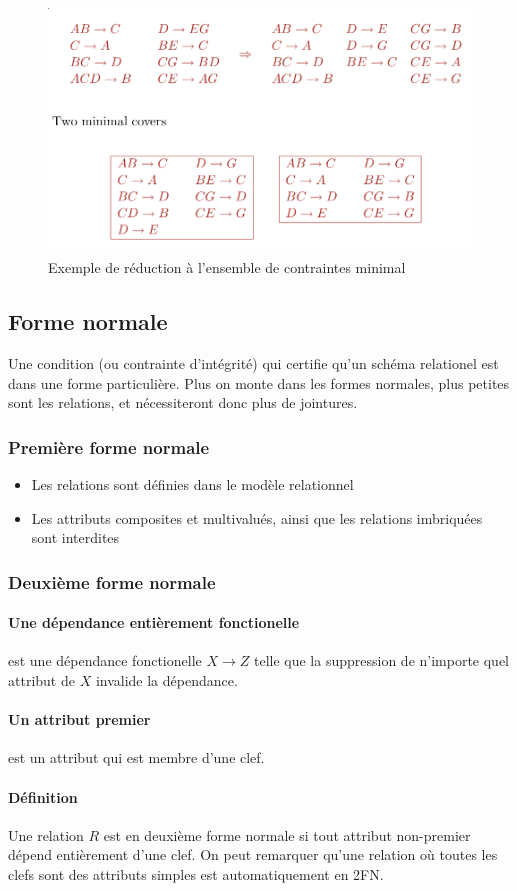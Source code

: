 \documentclass[a4paper]{article}
\begin{document}
\begin{figure}[H]
\center
\includegraphics[width=.6\textwidth]{fig/df-reduction.png}
\caption{Exemple de réduction à l'ensemble de contraintes minimal}
\end{figure}

\subsection{Forme normale}
Une condition (ou contrainte d'intégrité) qui certifie qu'un schéma relationel
est dans une forme particulière. Plus on monte dans les formes normales, plus petites
sont les relations, et nécessiteront donc plus de jointures.

\subsubsection{Première forme normale}
\begin{itemize}
  \item Les relations sont définies dans le modèle relationnel
  \item Les attributs composites et multivalués, ainsi que les relations imbriquées
        sont interdites
\end{itemize}

\subsubsection{Deuxième forme normale}
\paragraph{Une dépendance entièrement fonctionelle} est une dépendance fonctionelle
$X \rightarrow Z$ telle que la suppression de n'importe quel attribut de $X$ invalide
la dépendance.
\paragraph{Un attribut premier} est un attribut qui est membre d'une clef.
\paragraph{Définition} Une relation $R$ est en deuxième forme normale si tout
attribut non-premier dépend entièrement d'une clef. On peut remarquer qu'une relation
où toutes les clefs sont des attributs simples est automatiquement en 2FN.
\end{document}

